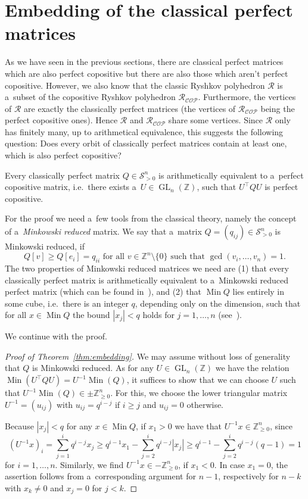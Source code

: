 \documentclass{commat}
\newcommand{\IZ}{{\mathbb{Z}}}
\newcommand{\IZn}{\IZ^n}
\newcommand{\sR}{\mathcal{R}}
\newcommand{\sngo}{{\mathcal{S}}^{n}_{>0}}
\newcommand{\IZngeo}{\IZ_{\geq0}^n}
\newcommand{\IZnmo}{\IZn\setminus\{0\}}
\newcommand{\cop}{{\mathcal{COP}}}
\DeclareMathOperator{\Min}{Min}
\newcommand{\gl}{\operatorname{GL}}
\newcommand{\glnz}{\gl_n (\IZ)}
\begin{document}
\section{Embedding of the classical perfect matrices}\label{sec:embedding}

As we have seen in the previous sections, there are classical perfect matrices which are also
perfect copositive but there are also those which aren't perfect copositive.
However, we also know that the classic Ryshkov polyhedron \(\sR \) is a~subset of the copositive
Ryshkov polyhedron \(\sR_\cop \).
Furthermore, the vertices of \(\sR \) are exactly the classically perfect matrices
(the vertices of \(\sR_\cop \) being the perfect copositive ones).
Hence \(\sR \) and \(\sR_\cop \) share some vertices.
Since \(\sR \) only has finitely many, up to arithmetical equivalence,
this suggests the following question:
Does every orbit of classically perfect matrices contain at least one,
which is also perfect copositive?
\begin{theorem}\label{thm:embedding}
	Every classically perfect matrix \(Q\in\sngo \) is arithmetically equivalent
    to a~perfect copositive matrix, i.e.\ there exists a~\(U\in\glnz \),
	such that \(U^\intercal QU \) is perfect copositive.
\end{theorem}
For the proof we need a~few tools from the classical theory,
namely the concept of a~\emph{Minkowski reduced} matrix.
We say that a~matrix \(Q=(q_{ij})\in\sngo \) is Minkowski reduced, if
\[
	Q[v]\geq Q[e_i]=q_{ii} \text{ for all } v\in\IZnmo \text{ such that } \gcd(v_i,\dots,v_n)=1.
\]
The two properties of Minkowski reduced matrices we need are (1) that every classically perfect
matrix is arithmetically equivalent to a~Minkowski reduced perfect matrix (which can be found in~\cite[Theorem 2.2]{schuermann-2009}),
and (2) that \(\Min Q \) lies entirely in some cube, i.e.\ there is an integer $q$,
depending only on the dimension, such that for all \(x\in\Min Q \) the bound \(|x_j| < q \) holds
for \(j=1, \dots, n \) (see~\cite[Section 2.2]{schuermann-2009}).

We continue with the proof.

\begin{proof}[Proof of Theorem~\ref{thm:embedding}]
We may assume without loss of generality that $Q$ is Minkowski reduced.
As for any \(U\in\glnz \) we have the relation
\(\Min(U^\intercal QU)=U^{-1}\Min(Q) \),
it suffices to show that we can choose $U$ such that
\(U^{-1}\Min(Q)\in\pm\IZngeo \).
For this, we choose the lower triangular matrix \(U^{-1}=(u_{ij}) \)
with \(u_{ij}=q^{i-j} \) if \(i \geq j \) and \(u_{ij}=0 \) otherwise.

Because \(|x_j|<q \) for any \(x\in\Min Q \), if \(x_1>0 \) we have that \(U^{-1}x\in\IZngeo \),
since
\[
    {(U^{-1}x)}_i=\sum_{j=1}^{i}q^{i-j}x_j \geq q^{i-1}x_1 - \sum_{j=2}^{i}q^{i-j}|x_j|
    \geq q^{i-1} - \sum_{j=2}^{i}q^{i-j}(q-1) = 1
\]
for \(i=1,\ldots, n \).
Similarly, we find \(U^{-1}x\in-\IZngeo \), if \(x_1<0 \).
In case \(x_1=0 \), the assertion follows from a~corresponding argument for \(n-1 \),
respectively for \(n-k \) with \(x_{k}\neq0 \) and \(x_j=0 \) for \(j<k \).
\end{proof}
\end{document}

